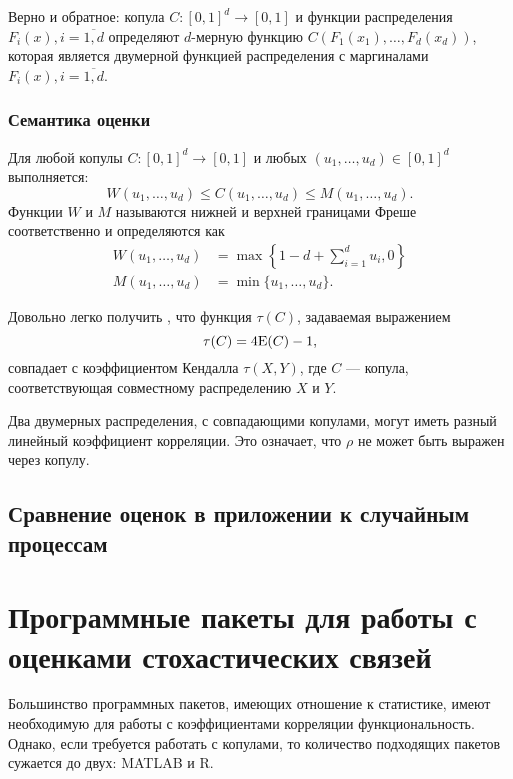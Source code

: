 Верно и обратное: копула $C: [0, 1]^d \rightarrow [0, 1]$ и функции распределения $F_i(x), i = \overline{1, d}$ определяют $d$-мерную функцию $C(F_1(x_1), \ldots, F_d(x_d))$, которая является двумерной функцией распределения с маргиналами $F_i(x), i = \overline{1, d}$.
\subsubsection*{Семантика оценки}
Для любой копулы $C: [0, 1]^d \rightarrow [0, 1]$ и любых $(u_1, \ldots, u_d) \in [0, 1]^d$ выполняется:
\begin{equation}
	W(u_1, \ldots, u_d) \leq C(u_1, \ldots, u_d) \leq M(u_1, \ldots, u_d).
\end{equation}
Функции $W$ и $M$ называются нижней и верхней границами Фреше соответственно и определяются как
\begin{align}
	W(u_1, \ldots, u_d) &= \max\left\{1 - d + \sum_{i = 1}^d {u_i} , 0 \right\} \\
	M(u_1, \ldots, u_d) &= \min \{u_1, \dots, u_d\}.
\end{align}

Довольно легко получить \cite{Nelsen1999}, что функция $\tau(C)$, задаваемая выражением
\begin{equation}
	\tau(C) = 4\mathrm{E}(C) - 1,
\end{equation}
совпадает с коэффициентом Кендалла $\tau(X, Y)$, где $C$ --- копула, соответствующая совместному распределению $X$ и $Y$.

Два двумерных распределения, с совпадающими копулами, могут иметь разный линейный коэффициент корреляции. Это означает, что $\rho$ не может быть выражен через копулу.

\subsection*{Сравнение оценок в приложении к случайным процессам}

\section*{Программные пакеты для работы с оценками стохастических связей}
Большинство программных пакетов, имеющих отношение к статистике, имеют необходимую для работы с коэффициентами корреляции функциональность. Однако, если требуется работать с копулами, то количество подходящих пакетов сужается до двух: MATLAB и R.

